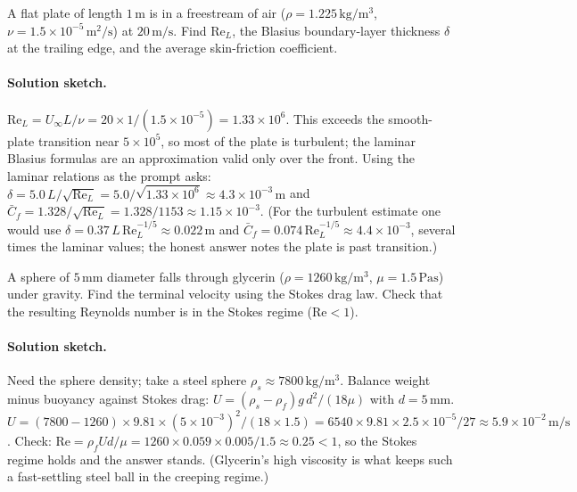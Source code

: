 \begin{exercise}
A flat plate of length $1\,\si{\meter}$ is in a freestream of air
($\rho = 1.225\,\si{\kilogram\per\meter\cubed}$, $\nu = 1.5\times
10^{-5}\,\si{\meter}^2/\si{\second}$) at $20\,\si{\meter\per
\second}$. Find $\text{Re}_L$, the Blasius boundary-layer thickness
$\delta$ at the trailing edge, and the average skin-friction
coefficient.

\paragraph{Solution sketch.} $\text{Re}_L = U_\infty L/\nu =
20\times1/(1.5\times10^{-5}) = 1.33\times10^{6}$. This exceeds the
smooth-plate transition near $5\times10^5$, so most of the plate is
turbulent; the laminar Blasius formulas are an approximation valid
only over the front. Using the laminar relations as the prompt asks:
$\delta = 5.0\,L/\sqrt{\text{Re}_L} = 5.0/\sqrt{1.33\times10^6}
\approx 4.3\times10^{-3}\,\si{\meter}$ and $\bar C_f = 1.328/\sqrt{
\text{Re}_L} = 1.328/1153 \approx 1.15\times10^{-3}$. (For the
turbulent estimate one would use $\delta = 0.37\,L\,\text{Re}_L^{-1/5}
\approx 0.022\,\si{\meter}$ and $\bar C_f = 0.074\,\text{Re}_L^{-1/5}
\approx 4.4\times10^{-3}$, several times the laminar values; the
honest answer notes the plate is past transition.)
\end{exercise}

\begin{exercise}
A sphere of $5\,\si{\milli\meter}$ diameter falls through glycerin
($\rho = 1260\,\si{\kilogram\per\meter\cubed}$, $\mu = 1.5\,\si{
\pascal\second}$) under gravity. Find the terminal velocity using
the Stokes drag law. Check that the resulting Reynolds number is
in the Stokes regime ($\text{Re} < 1$).

\paragraph{Solution sketch.} Need the sphere density; take a steel
sphere $\rho_s \approx 7800\,\si{\kilogram\per\meter\cubed}$.
Balance weight minus buoyancy against Stokes drag:
$U = (\rho_s - \rho_f)g\,d^2/(18\mu)$ with $d = 5\,\si{\milli\meter}$.
$U = (7800-1260)\times9.81\times(5\times10^{-3})^2/(18\times1.5)
= 6540\times9.81\times2.5\times10^{-5}/27 \approx 5.9\times10^{-2}
\,\si{\meter\per\second}$. Check: $\text{Re} = \rho_f U d/\mu =
1260\times0.059\times0.005/1.5 \approx 0.25 < 1$, so the Stokes
regime holds and the answer stands. (Glycerin's high viscosity is
what keeps such a fast-settling steel ball in the creeping regime.)
\end{exercise}

